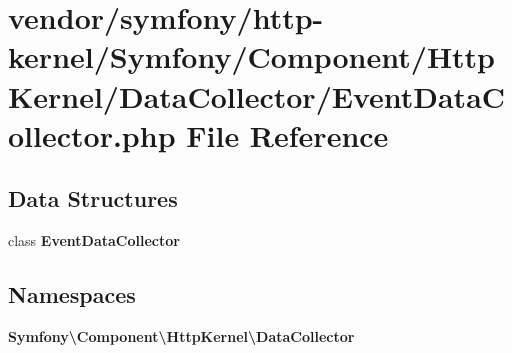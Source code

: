\section{vendor/symfony/http-\/kernel/\+Symfony/\+Component/\+Http\+Kernel/\+Data\+Collector/\+Event\+Data\+Collector.php File Reference}
\label{_event_data_collector_8php}
\subsection*{Data Structures}
\begin{DoxyCompactItemize}
\item 
class {\bf Event\+Data\+Collector}
\end{DoxyCompactItemize}
\subsection*{Namespaces}
\begin{DoxyCompactItemize}
\item 
 {\bf Symfony\textbackslash{}\+Component\textbackslash{}\+Http\+Kernel\textbackslash{}\+Data\+Collector}
\end{DoxyCompactItemize}
